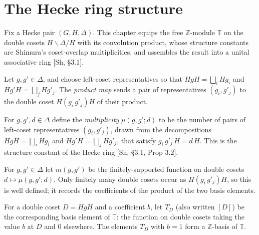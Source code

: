 \chapter{The Hecke ring structure}\label{chap:ring-structure}

Fix a Hecke pair $(G,H,\Delta)$. This chapter equips the free $\mathbb{Z}$-module
$\mathbb{T}$ on the double cosets $H\backslash\Delta/H$ with its convolution product,
whose structure constants are Shimura's coset-overlap multiplicities, and assembles the
result into a unital associative ring [Sh, \S3.1].

\begin{definition}\label{def:mulMap}
\leanok
Let $g,g'\in\Delta$, and choose left-coset representatives so that
$HgH=\bigsqcup_i Hg_i$ and $Hg'H=\bigsqcup_j Hg'_j$. The \emph{product map} sends a pair
of representatives $(g_i,g'_j)$ to the double coset $H(g_i\,g'_j)H$ of their product.
\end{definition}

\begin{definition}\label{def:hecke-multiplicity}
\leanok
For $g,g',d\in\Delta$ define the \emph{multiplicity} $\mu(g,g';d)$ to be the number of
pairs of left-coset representatives $(g_i,g'_j)$, drawn from the decompositions
$HgH=\bigsqcup_i Hg_i$ and $Hg'H=\bigsqcup_j Hg'_j$, that satisfy
$g_i\,g'_j\,H=d\,H$. This is the structure constant of the Hecke ring
[Sh, \S3.1, Prop 3.2].
\end{definition}

\begin{definition}\label{def:m-finsupp}
\leanok
For $g,g'\in\Delta$ let $m(g,g')$ be the finitely-supported function on double cosets
$d\mapsto\mu(g,g';d)$. Only finitely many double cosets occur as $H(g_i\,g'_j)H$, so this
is well defined; it records the coefficients of the product of the two basis elements.
\end{definition}

\begin{definition}\label{def:T-single}
\leanok
For a double coset $D=HgH$ and a coefficient $b$, let $T_D$ (also written $[D]$) be the
corresponding basis element of $\mathbb{T}$: the function on double cosets taking the
value $b$ at $D$ and $0$ elsewhere. The elements $T_D$ with $b=1$ form a $\mathbb{Z}$-basis
of $\mathbb{T}$.
\end{definition}

